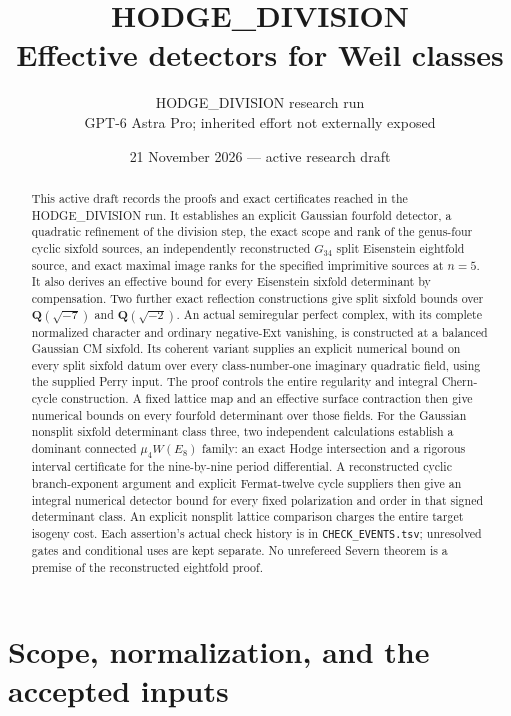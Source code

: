\documentclass[11pt]{article}
\title{HODGE\_DIVISION\\Effective detectors for Weil classes}
\author{HODGE\_DIVISION research run\\GPT-6 Astra Pro; inherited effort not externally exposed}
\date{21 November 2026 --- active research draft}
\theoremstyle{remark}\newtheorem{remark}[theorem]{Remark}
\begin{document}
\maketitle

\begin{abstract}
This active draft records the proofs and exact certificates reached in the
HODGE\_DIVISION run. It establishes an explicit Gaussian fourfold detector,
a quadratic refinement of the division step, the exact scope and rank of
the genus-four cyclic sixfold sources, an independently reconstructed
$G_{34}$ split Eisenstein eightfold source, and exact maximal image ranks
for the specified imprimitive sources at $n=5$. It also derives an effective
bound for every Eisenstein sixfold determinant by compensation. Two further
exact reflection constructions give split sixfold bounds over
$\mathbf Q(\sqrt{-7})$ and $\mathbf Q(\sqrt{-2})$. An actual semiregular
perfect complex, with its complete normalized character and ordinary
negative-Ext vanishing, is constructed at a balanced Gaussian CM sixfold.
Its coherent variant supplies an explicit numerical bound on every
split sixfold datum over every class-number-one imaginary quadratic
field, using the supplied Perry input. The proof controls the entire
regularity and integral Chern-cycle construction. A fixed lattice map
and an effective surface contraction then give numerical bounds on
every fourfold determinant over those fields.
For the Gaussian nonsplit sixfold determinant class three, two
independent calculations establish a dominant connected $\mu_4W(E_8)$
family: an exact Hodge intersection and a rigorous interval certificate
for the nine-by-nine period differential. A reconstructed cyclic
branch-exponent argument and explicit Fermat-twelve cycle suppliers
then give an integral numerical detector bound for every fixed
polarization and order in that signed determinant class. An explicit
nonsplit lattice comparison charges the entire target isogeny cost.
Each assertion's actual check history is in \texttt{CHECK\_EVENTS.tsv};
unresolved gates and conditional uses are kept separate. No unrefereed
Severn theorem is a premise of the reconstructed eightfold proof.
\end{abstract}
\tableofcontents

\section{Scope, normalization, and the accepted inputs}
\end{document}
